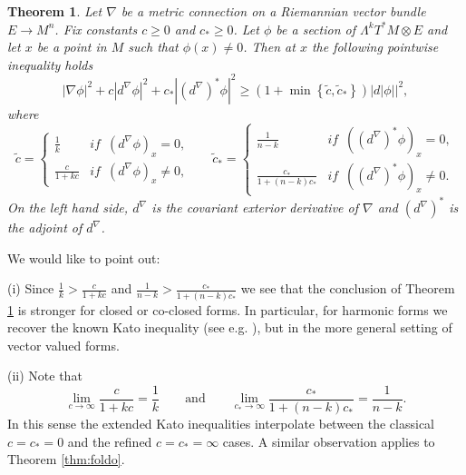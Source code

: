 \documentclass[12pt]{amsart} %
\newtheorem{theorem}{Theorem}[section]
\theoremstyle{definition}
\numberwithin{equation}{section}
\newcommand{\ra}{\rightarrow}
\begin{document}
\begin{theorem}
\label{thm:hodge} Let $\nabla$ be a metric connection on a Riemannian vector bundle $E \ra M^n$. Fix constants $c\geq 0$ and $c_{*}\geq 0$. Let $\phi$ be a section of $\Lambda^{k}T^{*}M\otimes E$ and let $x$ be a point in $M$ such that $\phi(x)\neq0$. Then at $x$ the following pointwise inequality holds
\[
|\nabla\phi|^{2}+c|d^\nabla \phi|^{2}+c_{*}|(d^{\nabla})^*\phi|^{2}\geq\left(1+\min\left\{ \tilde{c},\tilde{c}_{*}\right\} \right)|d|\phi||^{2},
\]
where
\[
\tilde{c}=\begin{cases}
\frac{1}{k} & if\,\,\,\left(d^\nabla \phi\right)_{x}=0,\\
\frac{c}{1+kc} & if\,\,\,\left(d^\nabla \phi\right)_{x}\neq0,
\end{cases}\,\,\,\,\,\,\,\,\,\,\tilde{c}_{*}=\begin{cases}
\frac{1}{n-k} & if\,\,\,\left((d^\nabla)^{*}\phi\right)_{x}=0,\\
\frac{c_{*}}{1+\left(n-k\right)c_{*}} & if\,\,\,\left((d^\nabla)^{*}\phi\right)_{x}\neq0.
\end{cases}
\]
On the left hand side, $d^\nabla$ is the covariant exterior derivative of
$\nabla$ and $(d^\nabla)^*$ is the adjoint of $d^\nabla$.
\end{theorem}
We would like to point out:

(i) Since $\frac{1}{k}>\frac{c}{1+kc}$ and $\frac{1}{n-k}>\frac{c_{*}}{1+\left(n-k\right)c_{*}}$
we see that the conclusion of Theorem \ref{thm:hodge} is stronger
for closed or co-closed forms. In particular, for harmonic forms
we recover the known Kato inequality (see e.g. \cite{CZ2012}), but
in the more general setting of vector valued forms.

(ii) Note that \[\lim_{c\to\infty}\frac{c}{1+kc}=\frac{1}{k}\qquad \mbox{and} \qquad
\lim_{c_{*}\to\infty}\frac{c_{*}}{1+\left(n-k\right)c_{*}}=\frac{1}{n-k}.\] In this sense the extended Kato inequalities interpolate between the classical $c=c_*=0$ and the refined $c=c_*=\infty$ cases. A similar observation applies to Theorem \ref{thm:foldo}.
\end{document}
